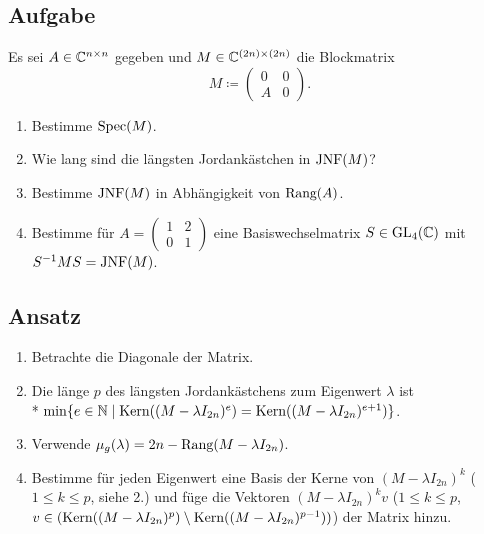 \subsection{Aufgabe}
Es sei \( A \in \mathbb{C}^{n \times n} \) gegeben und \( M \in \mathbb{C}^{(2n) \times (2n)} \) die Blockmatrix
\begin{equation*}
	M \coloneqq \begin{pmatrix}
		0 & 0 \\
		A & 0 
	\end{pmatrix}\text{.}
\end{equation*}
\begin{enumerate}
	\item Bestimme \( \text{Spec}(M) \).
	\item Wie lang sind die längsten Jordankästchen in \( \text{JNF}(M) \)?
	\item Bestimme \( \text{JNF}(M) \) in Abhängigkeit von \( \text{Rang}(A) \).
	\item Bestimme für \( A = \left( \begin{smallmatrix}
		1 & 2 \\
		0 & 1
	\end{smallmatrix} \right) \) eine Basiswechselmatrix \( S \in \text{GL}_4(\mathbb{C}) \) mit \( S^{-1}MS = \text{JNF}(M) \).
\end{enumerate}

\subsection{Ansatz}
\begin{enumerate}
	\item Betrachte die Diagonale der Matrix.
	\item Die länge \( p \) des längsten Jordankästchens zum Eigenwert \( \lambda \) ist \\* \( \min\{ e \in \mathbb{N} \mid \text{Kern}((M  - \lambda I_{2n})^e) = \text{Kern}((M - \lambda I_{2n})^{e+1}) \} \).
	\item Verwende \( \mu_g(\lambda) = 2n - \text{Rang}(M-\lambda I_{2n}) \).
	\item Bestimme für jeden Eigenwert eine Basis der Kerne von \( (M - \lambda I_{2n})^k \) (\( 1 \leq k \leq p \), siehe 2.) und füge die Vektoren \( (M - \lambda I_{2n})^kv \) (\( 1 \leq k \leq p \), \( v \in (\text{Kern}((M - \lambda I_{2n})^p) \setminus \text{Kern}((M - \lambda I_{2n})^{p-1})) \)) der Matrix hinzu.
\end{enumerate}

